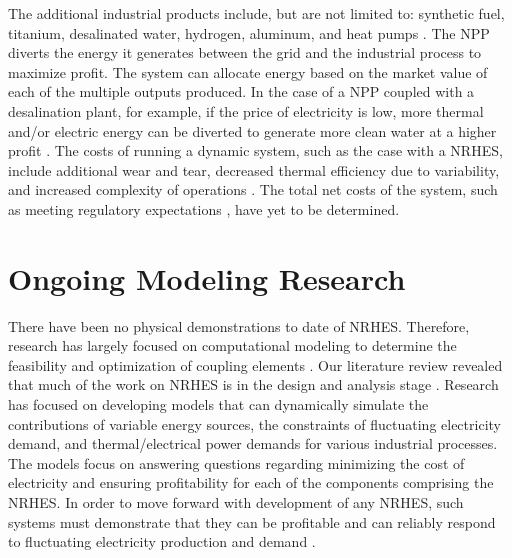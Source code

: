\documentclass[12pt]{UIdahoMastersThesis}
\begin{document}
The additional industrial products include, but are not limited to: synthetic fuel, titanium, desalinated water, hydrogen, aluminum, and heat pumps \cite{Bienvenue2015}. The NPP diverts the energy it generates between the grid and the industrial process to maximize profit. The system can allocate energy based on the market value of each of the multiple outputs produced. In the case of a NPP coupled with a desalination plant, for example, if the price of electricity is low, more thermal and/or electric energy can be diverted to generate more clean water at a higher profit \cite {Chen2016}. The costs of running a dynamic system, such as the case with a NRHES, include additional wear and tear, decreased thermal efficiency  due to variability, and increased complexity of operations  \cite{Garcia2013}. The total net costs of the system, such as meeting regulatory expectations , have yet to be determined.

\section{Ongoing Modeling Research}
There have been no physical demonstrations to date of NRHES. Therefore, research has largely focused on computational modeling to determine the feasibility and optimization of coupling elements \cite{Rabiti2015, Boardman2013, Shropshire2012}. Our literature review revealed that much of the work on NRHES is in the design and analysis stage \cite{Epiney2016, Boardman2013, Shropshire2012}. Research has focused on developing models that can dynamically simulate the contributions of variable energy sources, the constraints of fluctuating electricity demand, and thermal/electrical power demands for various industrial processes. The models focus on answering questions regarding minimizing the cost of electricity and ensuring profitability for each of the components comprising the NRHES. In order to move forward with development of any NRHES, such systems must demonstrate that they can be profitable and can reliably respond to fluctuating electricity production and demand \cite{Rabiti2015}.
\end{document}

